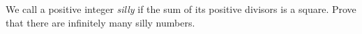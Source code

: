 We call a positive integer \emph{silly} if the sum of its positive divisors is a square.
Prove that there are infinitely many silly numbers.
